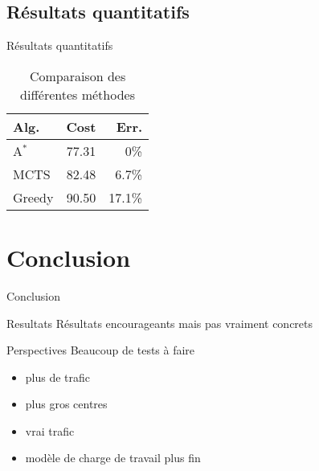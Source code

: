 \documentclass[tikz]{beamer}
\begin{document}
\subsection{Résultats quantitatifs}
\begin{frame}[c]{Résultats quantitatifs}
\begin{table}
  \centering
  \begin{tabulary}
    {\textwidth}{LRR}
    Alg.    & Cost  & Err.   \\
    \toprule
    A\(^*\) & 77.31 & 0\%    \\
    MCTS    & 82.48 & 6.7\%  \\
    Greedy  & 90.50 & 17.1\% \\
  \end{tabulary}
  \caption{Comparaison des différentes méthodes}\label{tab:methods_compare}
\end{table}
\end{frame}
\section*{Conclusion}
\begin{frame}[c]{Conclusion}
  \begin{block}{Resultats}
    Résultats encourageants mais pas vraiment concrets
  \end{block}
  \begin{block}{Perspectives}
    Beaucoup de tests à faire
    \begin{itemize}
      \item plus de trafic
      \item plus gros centres
      \item vrai trafic
      \item modèle de charge de travail plus fin
    \end{itemize}
  \end{block}
\end{frame}
\end{document}
